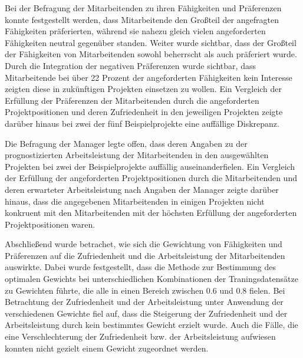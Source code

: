 Bei der Befragung der Mitarbeitenden zu ihren Fähigkeiten und Präferenzen konnte festgestellt werden, dass Mitarbeitende den Großteil der angefragten Fähigkeiten präferierten, während sie nahezu gleich vielen angeforderten Fähigkeiten neutral gegenüber standen.
Weiter wurde sichtbar, dass der Großteil der Fähigkeiten von Mitarbeitenden sowohl beherrscht als auch präferiert wurde.
Durch die Integration der negativen Präferenzen wurde sichtbar, dass Mitarbeitende bei über 22 Prozent der angeforderten Fähigkeiten kein Interesse zeigten diese in zukünftigen Projekten einsetzen zu wollen.
Ein Vergleich der Erfüllung der Präferenzen der Mitarbeitenden durch die angeforderten Projektpositionen und deren Zufriedenheit in den jeweiligen Projekten zeigte darüber hinaus bei zwei der fünf Beispielprojekte eine auffällige Diskrepanz.

Die Befragung der Manager legte offen, dass deren Angaben zu der prognostizierten Arbeitsleistung der Mitarbeitenden in den ausgewählten Projekten bei zwei der Beispielprojekte auffällig auseinanderfielen. 
Ein Vergleich der Erfüllung der angeforderten Projektpositionen durch die Mitarbeitenden und deren erwarteter Arbeitsleistung nach Angaben der Manager zeigte darüber hinaus, dass die angegebenen Mitarbeitenden in einigen Projekten nicht konkruent mit den Mitarbeitenden mit der höchsten Erfüllung der angeforderten Projektpositionen waren.

Abschließend wurde betrachet, wie sich die Gewichtung von Fähigkeiten und Präferenzen auf die Zufriedenheit und die Arbeitsleistung der Mitarbeitenden auswirkte.
Dabei wurde festgestellt, dass die Methode zur Bestimmung des optimalen Gewichts bei unterschiedlichen Kombinationen der Traningsdatensätze zu Gewichten führte, die alle in einen Bereich zwischen 0.6 und 0.8 fielen.
Bei Betrachtung der Zufriedenheit und der Arbeitsleistung unter Anwendung der verschiedenen Gewichte fiel auf, dass die Steigerung der Zufriedenheit und der Arbeitsleistung durch kein bestimmtes Gewicht erzielt wurde.
Auch die Fälle, die eine Verschlechterung der Zufriedenheit bzw. der Arbeitsleistung aufwiesen konnten nicht gezielt einem Gewicht zugeordnet werden.

